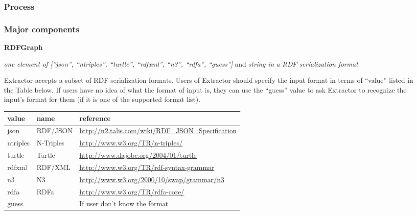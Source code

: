 \documentclass[letterpaper,10pt,english]{sphinxmanual}
\begin{document}
\subsubsection{Process}
\label{docs/extractor:process}

\subsubsection{Major components}
\label{docs/extractor:major-components}
\textbf{RDFGraph}

\emph{one element of {[}''json'', ``ntriples'', ``turtle'', ``rdfxml'', ``n3'', ``rdfa'', ``guess''{]}} and \emph{string in a RDF serialization format}

Extractor accepts a subset of RDF serialization formats. Users of Extractor should specify the input format in terms of ``value'' listed in the Table below. If users have no idea of what the format of input is, they can use the ``guess'' value to ask Extractor to recognize the input's format for them (if it is one of the supported format list).

\begin{tabulary}{\linewidth}{|L|L|L|}
\hline
\textsf{\relax 
value
} & \textsf{\relax 
name
} & \textsf{\relax 
reference
}\\
\hline
json
 & 
RDF/JSON
 & 
\href{http://n2.talis.com/wiki/RDF\_JSON\_Specification}{http://n2.talis.com/wiki/RDF\_JSON\_Specification}
\\

ntriples
 & 
N-Triples
 & 
\href{http://www.w3.org/TR/n-triples/}{http://www.w3.org/TR/n-triples/}
\\

turtle
 & 
Turtle
 & 
\href{http://www.dajobe.org/2004/01/turtle}{http://www.dajobe.org/2004/01/turtle}
\\

rdfxml
 & 
RDF/XML
 & 
\href{http://www.w3.org/TR/rdf-syntax-grammar}{http://www.w3.org/TR/rdf-syntax-grammar}
\\

n3
 & 
N3
 & 
\href{http://www.w3.org/2000/10/swap/grammar/n3}{http://www.w3.org/2000/10/swap/grammar/n3}
\\

rdfa
 & 
RDFa
 & 
\href{http://www.w3.org/TR/rdfa-core/}{http://www.w3.org/TR/rdfa-core/}
\\

guess
 &  & 
If user don't know the format
\\
\hline\end{tabulary}
\end{document}
